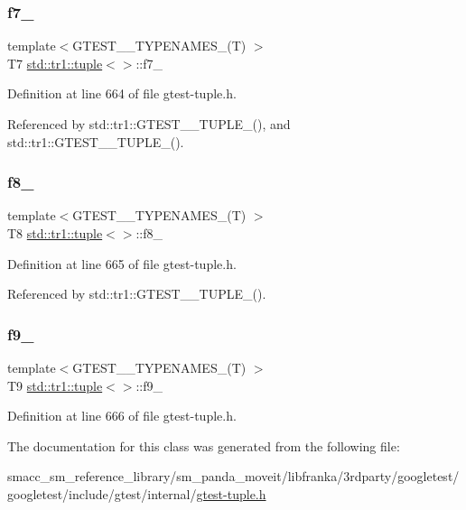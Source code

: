 \subsubsection{\texorpdfstring{f7\+\_\+}{f7\_}}
{\footnotesize\ttfamily template$<$G\+T\+E\+S\+T\+\_\+\_\+\+T\+Y\+P\+E\+N\+A\+M\+E\+S\+\_\+(\+T) $>$ \\
T7 \hyperlink{classstd_1_1tr1_1_1tuple}{std\+::tr1\+::tuple}$<$$>$\+::f7\+\_\+}



Definition at line 664 of file gtest-\/tuple.\+h.



Referenced by std\+::tr1\+::\+G\+T\+E\+S\+T\+\_\+\_\+\+T\+U\+P\+L\+E\+\_\+(), and std\+::tr1\+::\+G\+T\+E\+S\+T\+\_\+\_\+\+T\+U\+P\+L\+E\+\_\+().

\mbox{\label{classstd_1_1tr1_1_1tuple_ae859012c83943e54e035a4a32089ccb6}} 
\subsubsection{\texorpdfstring{f8\+\_\+}{f8\_}}
{\footnotesize\ttfamily template$<$G\+T\+E\+S\+T\+\_\+\_\+\+T\+Y\+P\+E\+N\+A\+M\+E\+S\+\_\+(\+T) $>$ \\
T8 \hyperlink{classstd_1_1tr1_1_1tuple}{std\+::tr1\+::tuple}$<$$>$\+::f8\+\_\+}



Definition at line 665 of file gtest-\/tuple.\+h.



Referenced by std\+::tr1\+::\+G\+T\+E\+S\+T\+\_\+\_\+\+T\+U\+P\+L\+E\+\_\+().

\mbox{\label{classstd_1_1tr1_1_1tuple_a336d5e582fd34e45ec88c78d473671dd}} 
\subsubsection{\texorpdfstring{f9\+\_\+}{f9\_}}
{\footnotesize\ttfamily template$<$G\+T\+E\+S\+T\+\_\+\_\+\+T\+Y\+P\+E\+N\+A\+M\+E\+S\+\_\+(\+T) $>$ \\
T9 \hyperlink{classstd_1_1tr1_1_1tuple}{std\+::tr1\+::tuple}$<$$>$\+::f9\+\_\+}



Definition at line 666 of file gtest-\/tuple.\+h.



The documentation for this class was generated from the following file\+:\begin{DoxyCompactItemize}
\item 
smacc\+\_\+sm\+\_\+reference\+\_\+library/sm\+\_\+panda\+\_\+moveit/libfranka/3rdparty/googletest/googletest/include/gtest/internal/\hyperlink{gtest-tuple_8h}{gtest-\/tuple.\+h}\end{DoxyCompactItemize}
